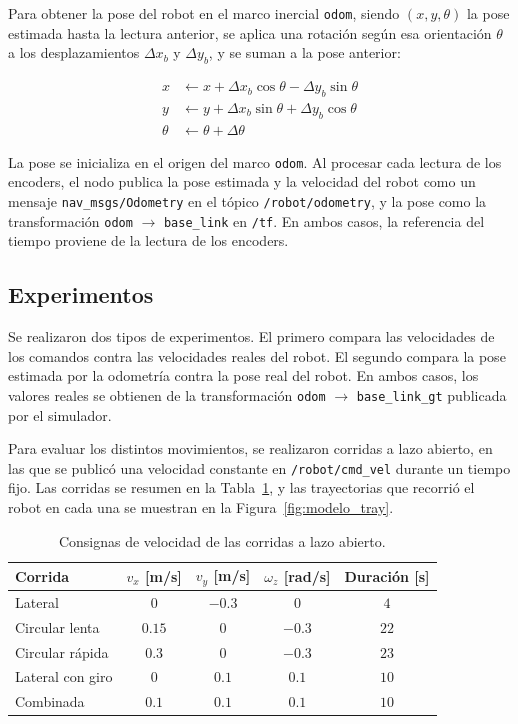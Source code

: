 \documentclass[11pt,a4paper]{article}
\begin{document}
Para obtener la pose del robot en el marco inercial \texttt{odom}, siendo $(x, y, \theta)$ la pose estimada hasta la lectura anterior, se aplica una rotación según esa orientación $\theta$ a los desplazamientos $\Delta x_b$ y $\Delta y_b$, y se suman a la pose anterior: 

\begin{align}
x &\leftarrow x + \Delta x_b\cos\theta - \Delta y_b\sin\theta\\
y &\leftarrow y + \Delta x_b\sin\theta + \Delta y_b\cos\theta\\
\theta &\leftarrow \theta + \Delta\theta
\end{align}

La pose se inicializa en el origen del marco \texttt{odom}. Al procesar cada lectura de los encoders, el nodo publica la pose estimada y la velocidad del robot como un mensaje \texttt{nav\_msgs/Odometry} en el tópico \texttt{/robot/odometry}, y la pose como la transformación \texttt{odom} $\rightarrow$ \texttt{base\_link} en \texttt{/tf}. En ambos casos, la referencia del tiempo proviene de la lectura de los encoders. 

\subsection{Experimentos}
\label{sec:modelo_exp}
Se realizaron dos tipos de experimentos. El primero compara las velocidades de los comandos contra las velocidades reales del robot. El segundo compara la pose estimada por la odometría contra la pose real del robot. En ambos casos, los valores reales se obtienen de la transformación \texttt{odom} $\rightarrow$ \texttt{base\_link\_gt} publicada por el simulador. 

Para evaluar los distintos movimientos, se realizaron corridas a lazo abierto, en las que se publicó una velocidad constante en \texttt{/robot/cmd\_vel} durante un tiempo fijo. Las corridas se resumen en la Tabla~\ref{tab:corridas_modelo}, y las trayectorias que recorrió el robot en cada una se muestran en la Figura~\ref{fig:modelo_tray}.

\begin{table}[htbp]
\centering
\begin{tabular}{lcccc}
\toprule
\textbf{Corrida} & $v_x$ [m/s] & $v_y$ [m/s] & $\omega_z$ [rad/s] & \textbf{Duración} [s] \\
\midrule
Lateral & $0$ & $-0.3$ & $0$ & $4$ \\
Circular lenta & $0.15$ & $0$ & $-0.3$ & $22$ \\
Circular rápida & $0.3$ & $0$ & $-0.3$ & $23$ \\
Lateral con giro & $0$ & $0.1$ & $0.1$ & $10$ \\
Combinada & $0.1$ & $0.1$ & $0.1$ & $10$ \\
\bottomrule
\end{tabular}
\caption{Consignas de velocidad de las corridas a lazo abierto.}
\label{tab:corridas_modelo}
\end{table}
\end{document}

